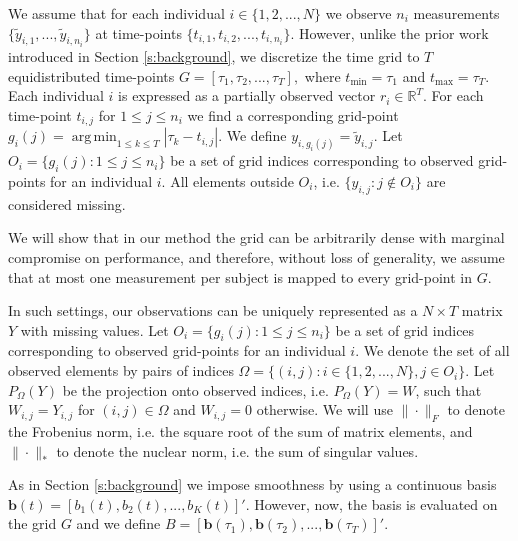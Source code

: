 \documentclass[preprint]{imsart}
\numberwithin{equation}{section}
\theoremstyle{plain}
\newcommand{\R}{\mathbb{R}}
\newcommand{\bb}{\mathbf{b}}
\DeclareMathOperator*{\argmin}{arg\,min}
\begin{document}
We assume that for each individual $i \in \{1,2,...,N\}$ we observe $n_i$ measurements $\{\tilde y_{i,1},...,\tilde y_{i,n_i}\}$ at time-points $\{t_{i,1},t_{i,2},...,t_{i,n_i}\}$. However, unlike the prior work introduced in Section \ref{s:background}, we discretize the time grid to $T$ equidistributed time-points $G = \left[\tau_1, \tau_2, ..., \tau_T\right],$ where $t_{\min} = \tau_1$ and $t_{\max} = \tau_T$. Each individual $i$ is expressed as a partially observed vector $r_i \in \R^T$. For each time-point $t_{i,j}$ for $1 \leq j \leq n_i$ we find a corresponding grid-point $g_i(j) = \argmin_{1 \leq k \leq T}  |\tau_k - t_{i,j}|$. We define $y_{i,g_i(j)} = \tilde y_{i,j}$. Let $O_i = \{g_i(j): 1 \leq j \leq n_i \}$ be a set of grid indices corresponding to observed grid-points for an individual $i$. All elements outside $O_i$, i.e. $\{y_{i,j} : j \notin O_i\}$ are considered missing.

We will show that in our method the grid can be arbitrarily dense with marginal compromise on performance, and therefore, without loss of generality, we assume that at most one measurement per subject is mapped to every grid-point in $G$.

In such settings, our observations can be uniquely represented as a $N \times T$ matrix $Y$ with missing values. Let $O_i = \{g_i(j): 1 \leq j \leq n_i \}$ be a set of grid indices corresponding to observed grid-points for an individual $i$. We denote the set of all observed elements by pairs of indices $\Omega = \{ (i,j) : i\in \{1,2,...,N\}, j \in O_i \}$. Let $P_\Omega(Y)$ be the projection onto observed indices, i.e. $P_\Omega(Y) = W$, such that $W_{i,j} = Y_{i,j}$ for $(i,j) \in \Omega$ and $W_{i,j} = 0$ otherwise. We will use $\|\cdot\|_F$ to denote the Frobenius norm, i.e. the square root of the sum of matrix elements, and $\|\cdot\|_*$ to denote the nuclear norm, i.e. the sum of singular values.

As in Section \ref{s:background} we impose smoothness by using a continuous basis $\bb(t) = [b_1(t),b_2(t),...,b_K(t)]'$. However, now, the basis is evaluated on the grid $G$ and we define $B = [\bb(\tau_1),\bb(\tau_2),...,\bb(\tau_T)]'$.
\end{document}
